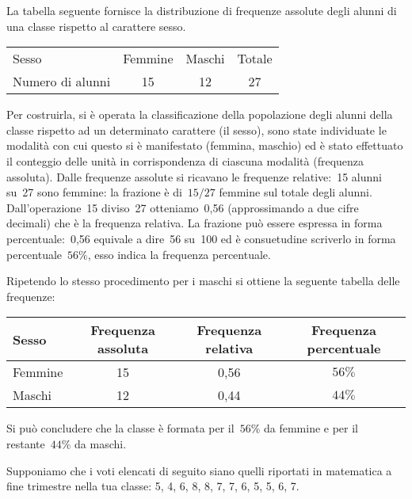 \begin{exrig}
 \begin{esempio}

La tabella seguente fornisce la distribuzione di frequenze assolute degli alunni di una classe rispetto al carattere sesso.

\begin{center}
\begin{tabular}{lccc}
\toprule
Sesso &Femmine &Maschi &Totale \\
Numero di alunni & 15 & 12 & 27 \\
\bottomrule
\end{tabular}
\end{center}

Per costruirla, si è operata la classificazione della popolazione degli alunni della classe rispetto ad un determinato carattere (il sesso),
sono state individuate le modalità con cui questo si è manifestato (femmina, maschio) ed è stato effettuato il conteggio delle unità
in corrispondenza di ciascuna modalità (frequenza assoluta).
Dalle frequenze assolute si ricavano le frequenze relative:~15 alunni su~27 sono femmine: la frazione è di~$15/27$ femmine sul totale degli alunni. Dall'operazione~15
diviso~27 otteniamo~0,56 (approssimando a due cifre decimali) che è la frequenza relativa.
La frazione può essere espressa in forma percentuale:~0,56 equivale a dire~56 su~100 ed è consuetudine scriverlo in forma percentuale~$56\%$,
esso indica la frequenza percentuale.

Ripetendo lo stesso procedimento per i maschi si ottiene la seguente tabella delle frequenze:

\begin{center}
\begin{tabular}{lccc}
\toprule
Sesso & Frequenza assoluta & Frequenza relativa & Frequenza percentuale \\
\midrule
Femmine & 15 & 0,56 & $56\%$ \\
Maschi & 12 & 0,44 & $44\%$ \\
\bottomrule
\end{tabular}
\end{center}
Si può concludere che la classe è formata per il~$56\%$ da femmine e per il restante~$44\%$ da maschi.
 \end{esempio}

 \begin{esempio}

Supponiamo che i voti elencati di seguito siano quelli riportati in matematica a fine trimestre
nella tua classe: 5, 4, 6, 8, 8, 7, 7, 6, 5, 5, 6, 7.


\end{esempio}
\end{exrig}
